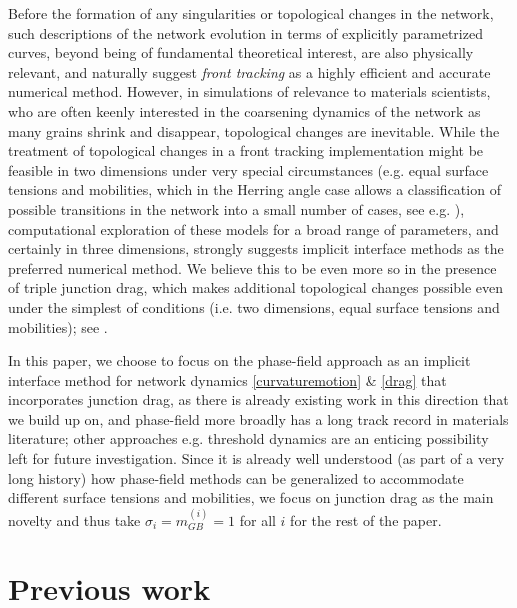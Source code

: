 \documentclass{article}
\theoremstyle{plain}
\theoremstyle{definition}
\theoremstyle{remark}
\begin{document}
Before the formation of any singularities or topological changes in the network, such descriptions of the network evolution in terms of explicitly parametrized curves, beyond being of fundamental theoretical interest, are also physically relevant, and naturally suggest {\em front tracking} as a highly efficient and accurate numerical method.
However, in simulations of relevance to materials scientists, who are often keenly interested in the coarsening dynamics of the network as many grains shrink and disappear, topological changes are inevitable.
While the treatment of topological changes in a front tracking implementation might be feasible in two dimensions under very special circumstances (e.g. equal surface tensions and mobilities, which in the Herring angle case allows a classification of possible transitions in the network into a small number of cases, see e.g. \cite{mantegazzanovagatortorelli, irregularnetworks}), computational exploration of these models for a broad range of parameters, and certainly in three dimensions, strongly suggests implicit interface methods as the preferred numerical method. 
We believe this to be even more so in the presence of triple junction drag, which makes additional topological changes possible even under the simplest of conditions (i.e. two dimensions, equal surface tensions and mobilities); see \cite{yangesedoglu25}.

In this paper, we choose to focus on the phase-field approach as an implicit interface method for network dynamics \eqref{curvaturemotion} \& \eqref{drag} that incorporates junction drag, as there is already existing work in this direction \cite{johnsonvoorhees,miyoshi2025} that we build up on, and phase-field more broadly has a long track record in materials literature; other approaches e.g. threshold dynamics \cite{mbo92,esedoglu_otto} are an enticing possibility left for future investigation.
Since it is already well understood (as part of a very long history) how phase-field methods can be generalized to accommodate different surface tensions and mobilities, we focus on junction drag as the main novelty and thus take $\sigma_i = m_{GB}^{(i)} = 1$ for all $i$ for the rest of the paper.




\section{Previous work}
\label{sec:previouswork}
\end{document}
